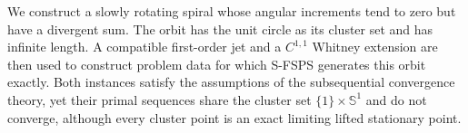 \documentclass[11pt]{article}
\numberwithin{equation}{section}
\begin{document}
We construct a slowly rotating spiral whose angular increments tend to zero
but have a divergent sum. The orbit has the unit circle as its cluster set and
has infinite length. A compatible first-order jet and a
\(C^{1,1}\) Whitney extension are then used to construct problem data for which
S-FSPS generates this orbit exactly. Both instances satisfy the assumptions of
the subsequential convergence theory, yet their primal sequences share the cluster
set \(\{1\}\times\mathbb S^1\) and do not converge, although every cluster
point is an exact limiting lifted stationary point.


\end{document}
